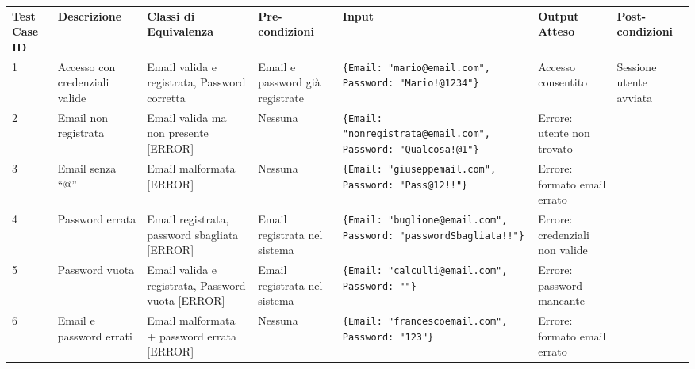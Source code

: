 \begin{sidewaystable}
\begin{tabular}{|p{2cm}|p{2cm}|p{2cm}|p{2cm}|p{5cm}|p{2cm}|p{2cm}|}
\hline
\rowcolor{SkyBlue}
\multicolumn{7}{l}{\textbf{Test Suite: Accesso}}\\
\hline
\rowcolor{Red}
\textbf{Test Case ID} & \textbf{Descrizione} & \textbf{Classi di Equivalenza} & \textbf{Pre-condizioni} & \textbf{Input} & \textbf{Output Atteso} & \textbf{Post-condizioni} \\
\hline
1 & Accesso con credenziali valide & Email valida e registrata, Password corretta & Email e password già registrate & \texttt{\{Email: "mario@email.com", Password: "Mario!@1234"\}} & Accesso consentito & Sessione utente avviata \\
\hline
2 & Email non registrata & Email valida ma non presente [ERROR] & Nessuna & \texttt{\{Email: "nonregistrata@email.com", Password: "Qualcosa!@1"\}} & Errore: utente non trovato & \\
\hline
3 & Email senza “@” & Email malformata [ERROR] & Nessuna & \texttt{\{Email: "giuseppemail.com", Password: "Pass@12!!"\}} & Errore: formato email errato & \\
\hline
4 & Password errata & Email registrata, password sbagliata [ERROR] & Email registrata nel sistema & \texttt{\{Email: "buglione@email.com", Password: "passwordSbagliata!!"\}} & Errore: credenziali non valide & \\
\hline
5 & Password vuota & Email valida e registrata, Password vuota [ERROR] & Email registrata nel sistema & \texttt{\{Email: "calculli@email.com", Password: ""\}} & Errore: password mancante & \\
\hline
6 & Email e password errati & Email malformata + password errata [ERROR] & Nessuna & \texttt{\{Email: "francescoemail.com", Password: "123"\}} & Errore: formato email errato & \\
\hline
\end{tabular}
\end{sidewaystable}

